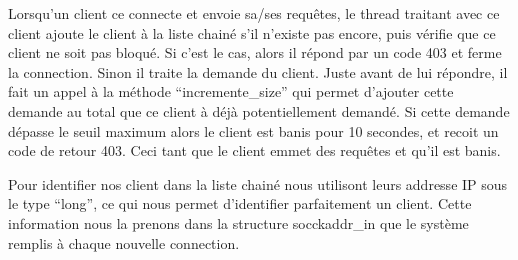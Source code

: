 \documentclass{article}
\begin{document}
Lorsqu'un client ce connecte et envoie sa/ses requêtes, le thread traitant avec ce client ajoute le client à la liste chainé s'il n'existe pas encore, puis vérifie que ce client ne soit pas bloqué. Si c'est le cas, alors il répond par un code 403 et ferme la connection. Sinon il traite la demande du client. Juste avant de lui répondre, il fait un appel à la méthode ``incremente\_size'' qui permet d'ajouter cette demande au total que ce client à déjà potentiellement demandé. Si cette demande dépasse le seuil maximum alors le client est banis pour 10 secondes, et recoit un code de retour 403. Ceci tant que le client emmet des requêtes et qu'il est banis.\hbox{}

Pour identifier nos client dans la liste chainé nous utilisont leurs addresse IP sous le type ``long'', ce qui nous permet d'identifier parfaitement un client. Cette information nous la prenons dans la structure socckaddr\_in que le système remplis à chaque nouvelle connection.\hbox{}
\end{document}
